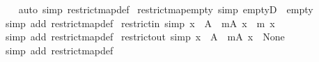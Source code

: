 \begin{isabellebody}
%
\isadelimproof
\ \ %
\endisadelimproof
%
\isatagproof
{}\isamarkupfalse%
\ {\isacharparenleft}{\kern0pt}auto\ simp{\isacharcolon}{\kern0pt}\ restrict{\isacharunderscore}{\kern0pt}map{\isacharunderscore}{\kern0pt}def{\isacharparenright}{\kern0pt}%
\endisatagproof
{\isafoldproof}%
%
\isadelimproof
\isanewline
%
\endisadelimproof
\isanewline
{}\isamarkupfalse%
\ restrict{\isacharunderscore}{\kern0pt}map{\isacharunderscore}{\kern0pt}empty\ {\isacharbrackleft}{\kern0pt}simp{\isacharbrackright}{\kern0pt}{\isacharcolon}{\kern0pt}\ {\isachardoublequoteopen}empty{\isacharbar}{\kern0pt}{\isacharbackquote}{\kern0pt}D\ {\isacharequal}{\kern0pt}\ empty{\isachardoublequoteclose}\isanewline
%
\isadelimproof
\ \ %
\endisadelimproof
%
\isatagproof
{}\isamarkupfalse%
\ {\isacharparenleft}{\kern0pt}simp\ add{\isacharcolon}{\kern0pt}\ restrict{\isacharunderscore}{\kern0pt}map{\isacharunderscore}{\kern0pt}def{\isacharparenright}{\kern0pt}%
\endisatagproof
{\isafoldproof}%
%
\isadelimproof
\isanewline
%
\endisadelimproof
\isanewline
{}\isamarkupfalse%
\ restrict{\isacharunderscore}{\kern0pt}in\ {\isacharbrackleft}{\kern0pt}simp{\isacharbrackright}{\kern0pt}{\isacharcolon}{\kern0pt}\ {\isachardoublequoteopen}x\ {\isasymin}\ A\ {\isasymLongrightarrow}\ {\isacharparenleft}{\kern0pt}m{\isacharbar}{\kern0pt}{\isacharbackquote}{\kern0pt}A{\isacharparenright}{\kern0pt}\ x\ {\isacharequal}{\kern0pt}\ m\ x{\isachardoublequoteclose}\isanewline
%
\isadelimproof
\ \ %
\endisadelimproof
%
\isatagproof
{}\isamarkupfalse%
\ {\isacharparenleft}{\kern0pt}simp\ add{\isacharcolon}{\kern0pt}\ restrict{\isacharunderscore}{\kern0pt}map{\isacharunderscore}{\kern0pt}def{\isacharparenright}{\kern0pt}%
\endisatagproof
{\isafoldproof}%
%
\isadelimproof
\isanewline
%
\endisadelimproof
\isanewline
{}\isamarkupfalse%
\ restrict{\isacharunderscore}{\kern0pt}out\ {\isacharbrackleft}{\kern0pt}simp{\isacharbrackright}{\kern0pt}{\isacharcolon}{\kern0pt}\ {\isachardoublequoteopen}x\ {\isasymnotin}\ A\ {\isasymLongrightarrow}\ {\isacharparenleft}{\kern0pt}m{\isacharbar}{\kern0pt}{\isacharbackquote}{\kern0pt}A{\isacharparenright}{\kern0pt}\ x\ {\isacharequal}{\kern0pt}\ None{\isachardoublequoteclose}\isanewline
%
\isadelimproof
\ \ %
\endisadelimproof
%
\isatagproof
{}\isamarkupfalse%
\ {\isacharparenleft}{\kern0pt}simp\ add{\isacharcolon}{\kern0pt}\ restrict{\isacharunderscore}{\kern0pt}map{\isacharunderscore}{\kern0pt}def{\isacharparenright}{\kern0pt}%
\endisatagproof
{\isafoldproof}%
%
\isadelimproof
\isanewline

\end{isabellebody}
